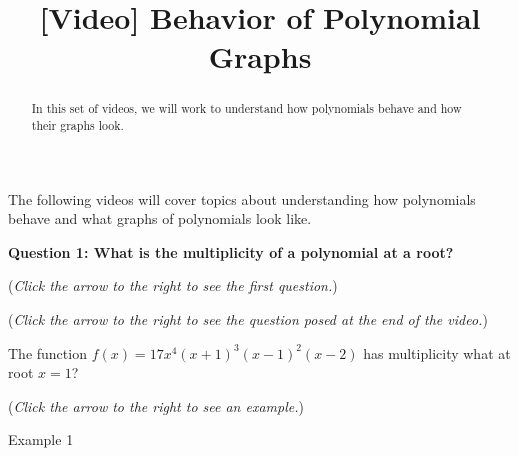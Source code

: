 \documentclass{ximera}
\title[Prerequisite Videos: ]{[Video] Behavior of Polynomial Graphs}
\begin{document}
\begin{abstract}
   In this set of videos, we will work to understand how 
   polynomials behave and how their graphs look.  
\end{abstract}
\maketitle


The following videos will cover topics about understanding how polynomials behave and what graphs of polynomials look like.

\textbf{Question 1: What is the multiplicity of a polynomial at a root?}
\begin{question}
\begin{flushright}
{\color{blue}(\emph{Click the arrow to the right to see the first question.})}
\end{flushright}
\begin{center}
\begin{expandable}
\begin{flushright}
{\color{blue}(\emph{Click the arrow to the right to see the question
posed at the end of the video.})}
\end{flushright}
\begin{expandable}
The function $f(x) = 17x^4(x+1)^3(x-1)^2(x-2)$ has multiplicity what at root $x=1$?
\begin{multipleChoice}
\end{multipleChoice}
\begin{flushright}
{\color{blue}(\emph{Click the arrow to the right to see an example.})}
\end{flushright}
\begin{expandable}
Example 1
\end{expandable}
\end{expandable}
\end{expandable}
\end{center}
\end{question}
\end{document}
